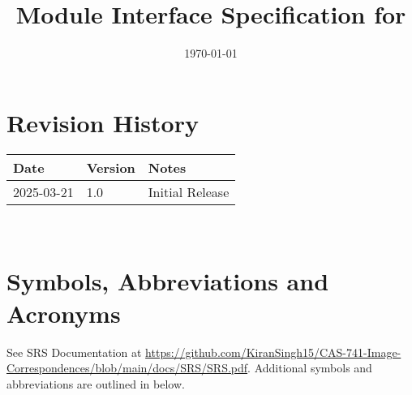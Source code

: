 \documentclass[12pt, titlepage]{article}
\begin{document}
\title{Module Interface Specification for \progname{}}

\author{\authname}

\date{\today}

\maketitle


\section{Revision History}

\begin{tabularx}{\textwidth}{p{3cm}p{2cm}X}
\toprule {\bf Date} & {\bf Version} & {\bf Notes}\\
\midrule
2025-03-21 & 1.0 & Initial Release\\
\bottomrule
\end{tabularx}

~\newpage

\section{Symbols, Abbreviations and Acronyms}

See SRS Documentation at \url{https://github.com/KiranSingh15/CAS-741-Image-Correspondences/blob/main/docs/SRS/SRS.pdf}. Additional 
symbols and abbreviations are outlined in below.
\end{document}
